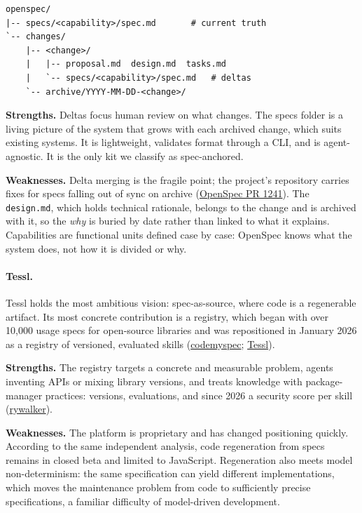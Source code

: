 \documentclass[11pt]{article}
\begin{document}
\begin{verbatim}
openspec/
|-- specs/<capability>/spec.md       # current truth
`-- changes/
    |-- <change>/
    |   |-- proposal.md  design.md  tasks.md
    |   `-- specs/<capability>/spec.md   # deltas
    `-- archive/YYYY-MM-DD-<change>/
\end{verbatim}

\textbf{Strengths.} Deltas focus human review on what changes. The specs folder is a living picture of the system that grows with each archived change, which suits existing systems. It is lightweight, validates format through a CLI, and is agent-agnostic. It is the only kit we classify as spec-anchored.

\textbf{Weaknesses.} Delta merging is the fragile point; the project's repository carries fixes for specs falling out of sync on archive (\href{https://github.com/Fission-AI/OpenSpec/pull/1241}{OpenSpec PR 1241}). The \texttt{design.md}, which holds technical rationale, belongs to the change and is archived with it, so the \emph{why} is buried by date rather than linked to what it explains. Capabilities are functional units defined case by case: OpenSpec knows what the system does, not how it is divided or why.

\paragraph{Tessl.} Tessl holds the most ambitious vision: spec-as-source, where code is a regenerable artifact. Its most concrete contribution is a registry, which began with over 10,000 usage specs for open-source libraries and was repositioned in January 2026 as a registry of versioned, evaluated skills (\href{https://codemyspec.com/blog/tessl-review}{codemyspec}; \href{https://docs.tessl.io/introduction-to-tessl/concepts}{Tessl}).

\textbf{Strengths.} The registry targets a concrete and measurable problem, agents inventing APIs or mixing library versions, and treats knowledge with package-manager practices: versions, evaluations, and since 2026 a security score per skill (\href{https://rywalker.com/research/tessl}{rywalker}).

\textbf{Weaknesses.} The platform is proprietary and has changed positioning quickly. According to the same independent analysis, code regeneration from specs remains in closed beta and limited to JavaScript. Regeneration also meets model non-determinism: the same specification can yield different implementations, which moves the maintenance problem from code to sufficiently precise specifications, a familiar difficulty of model-driven development.
\end{document}
